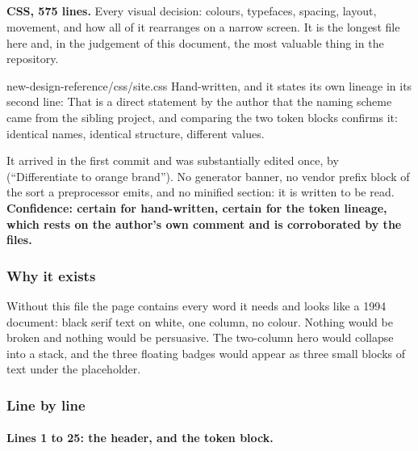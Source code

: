 \subsection{}

\textbf{CSS, 575 lines.} Every visual decision: colours, typefaces, spacing,
layout, movement, and how all of it rearranges on a narrow screen. It is the
longest file here and, in the judgement of this document, the most valuable thing
in the repository.

\begin{provenance}{new-design-reference/css/site.css}
Hand-written, and it states its own lineage in its second line:  That is a direct
statement by the author that the naming scheme came from the sibling project, and
comparing the two token blocks confirms it: identical names, identical structure,
different values.

It arrived in the first commit  and was substantially edited once, by
 (``Differentiate to orange brand''). No generator banner, no vendor
prefix block of the sort a preprocessor emits, and no minified section: it is
written to be read. \textbf{Confidence: certain for hand-written, certain for the
token lineage, which rests on the author's own comment and is corroborated by the
files.}
\end{provenance}

\subsubsection*{Why it exists}

Without this file the page contains every word it needs and looks like a 1994
document: black serif text on white, one column, no colour. Nothing would be
broken and nothing would be persuasive. The two-column hero would collapse into a
stack, and the three floating badges would appear as three small blocks of text
under the placeholder.

\subsubsection*{Line by line}

\paragraph{Lines 1 to 25: the header, and the token block.}

